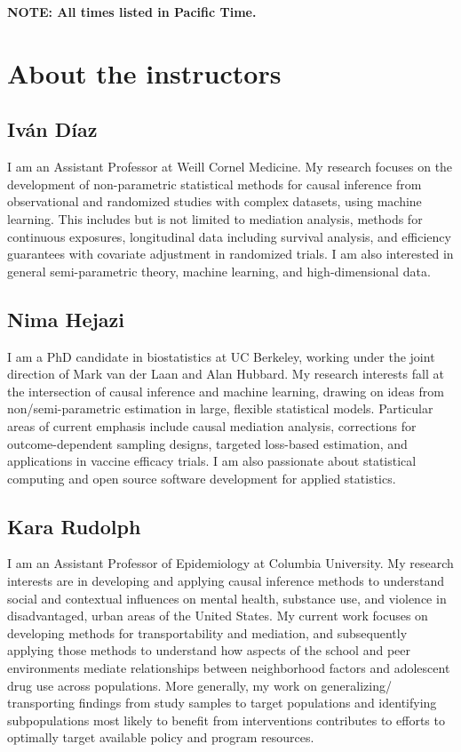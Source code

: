 \documentclass[
  12pt,
]{book}
\theoremstyle{definition}
\theoremstyle{definition}
\theoremstyle{definition}
\newcommand{\1}{\mathbbm{1}}
\begin{document}
\textbf{NOTE: All times listed in Pacific Time.}

\hypertarget{instructors}{%
\section{About the instructors}\label{instructors}}

\hypertarget{ivuxe1n-duxedaz}{%
\subsection*{Iván Díaz}\label{ivuxe1n-duxedaz}}


I am an Assistant Professor at Weill Cornel Medicine. My research focuses on the
development of non-parametric statistical methods for causal inference from
observational and randomized studies with complex datasets, using machine
learning. This includes but is not limited to mediation analysis, methods for
continuous exposures, longitudinal data including survival analysis, and
efficiency guarantees with covariate adjustment in randomized trials. I am also
interested in general semi-parametric theory, machine learning, and
high-dimensional data.

\hypertarget{nima-hejazi}{%
\subsection*{Nima Hejazi}\label{nima-hejazi}}


I am a PhD candidate in biostatistics at UC Berkeley, working under the joint
direction of Mark van der Laan and Alan Hubbard. My research interests fall at
the intersection of causal inference and machine learning, drawing on ideas from
non/semi-parametric estimation in large, flexible statistical models. Particular
areas of current emphasis include causal mediation analysis, corrections for
outcome-dependent sampling designs, targeted loss-based estimation, and
applications in vaccine efficacy trials. I am also passionate about statistical
computing and open source software development for applied statistics.

\hypertarget{kara-rudolph}{%
\subsection*{Kara Rudolph}\label{kara-rudolph}}


I am an Assistant Professor of Epidemiology at Columbia University. My research
interests are in developing and applying causal inference methods to understand
social and contextual influences on mental health, substance use, and violence
in disadvantaged, urban areas of the United States. My current work focuses on
developing methods for transportability and mediation, and subsequently applying
those methods to understand how aspects of the school and peer environments
mediate relationships between neighborhood factors and adolescent drug use
across populations. More generally, my work on generalizing/ transporting
findings from study samples to target populations and identifying subpopulations
most likely to benefit from interventions contributes to efforts to optimally
target available policy and program resources.
\end{document}
